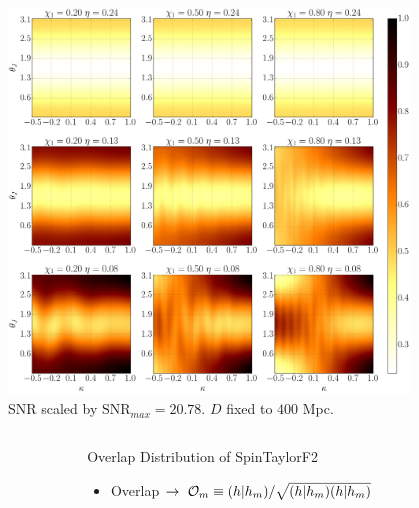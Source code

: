 \documentclass[final,hyperref={pdfpagelabels=false}, 11pt]{beamer}
\begin{document}
\begin{frame}[t]
\begin{columns}[t]
\begin{column}{.28\textwidth} %
\begin{figure}[!htb]
\includegraphics[width=0.7\linewidth]{figures/SNR_0F.pdf}
\caption{SNR scaled by
$\text{SNR}_{max}=20.78$. $D$ fixed to $400$ Mpc. }
\label{FIG:SNR}
\end{figure}
\end{column} %
\begin{column}{.01\textwidth}\end{column} %
\end{columns} %

\begin{columns}[t] %
\begin{column}{.01\textwidth}\end{column} %
\begin{column}{.35\textwidth}
\begin{block}{\small{Overlap Distribution of SpinTaylorF2}}
\begin{itemize}
\item \justifying Overlap $\rightarrow~{{\cal{O}}_{m}} \equiv (h|h_m)/\sqrt{
(h|h_m) (h|h_m)}$


\end{itemize}
\end{block}
\end{column}
\end{columns}
\end{frame}
\end{document}
